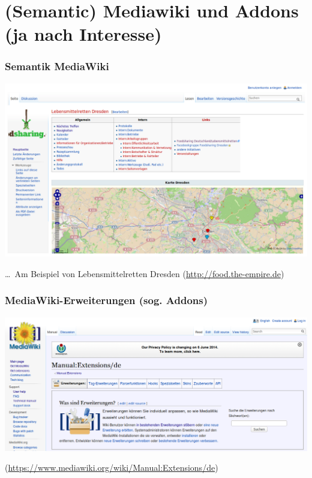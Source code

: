 \documentclass{beamer}
\begin{document}
\section{(Semantic) Mediawiki und Addons (ja nach Interesse)}

\begin{frame}
  \frametitle{Semantik MediaWiki}

  \begin{center}
    \includegraphics[width=\linewidth]
    {Lebensmittelretten-Dresden_Landkarte_mit_Seitenleisten}
  \end{center}

  \dots\ Am Beispiel von Lebensmittelretten Dresden
  (\url{http://food.the-empire.de})
\end{frame}
  
%
%


\begin{frame}
  \frametitle{MediaWiki-Erweiterungen (sog. Addons)}

  \begin{center}
    \includegraphics[width=\linewidth]{Mediawiki-Extensions}

    \medskip
    
    (\url{https://www.mediawiki.org/wiki/Manual:Extensions/de})
  \end{center}
  
\end{frame}
\end{document}
